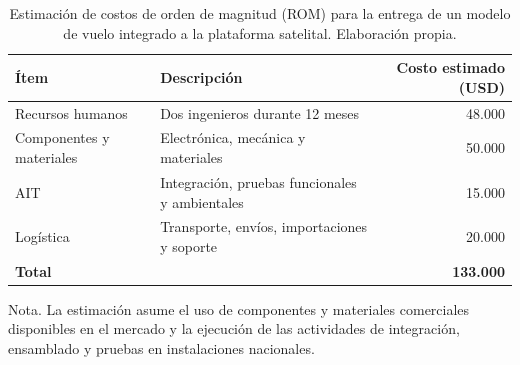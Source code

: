 \begin{table}[H]
\centering
\begin{threeparttable}
\caption{Estimación de costos de orden de magnitud (ROM) para la
entrega de un modelo de vuelo integrado a la plataforma satelital. Elaboración
propia.\vspace{1ex}}
\small
\begin{tabularx}{\textwidth}{@{}l X r@{}}
\toprule
\textbf{Ítem} & \textbf{Descripción} & \textbf{Costo estimado (USD)} \\
\midrule
Recursos humanos          & Dos ingenieros durante 12 meses                & 48.000 \\
Componentes y materiales  & Electrónica, mecánica y materiales             & 50.000 \\
AIT                       & Integración, pruebas funcionales y ambientales & 15.000 \\
Logística                 & Transporte, envíos, importaciones y soporte    & 20.000 \\
\midrule
\textbf{Total}            &                                                & \textbf{133.000} \\
\bottomrule
\end{tabularx}
\begin{tablenotes}[flushleft]\footnotesize
\item Nota. La estimación asume el uso de componentes y materiales comerciales
disponibles en el mercado y la ejecución de las actividades de integración,
ensamblado y pruebas en instalaciones nacionales.
\end{tablenotes}
\end{threeparttable}
\end{table}



